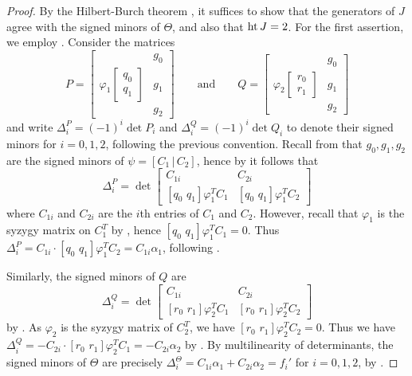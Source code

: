 \documentclass[reqno]{amsart}
\numberwithin{equation}{section}
\theoremstyle{definition}
\def\hgt{\mathop{\rm ht}}
\begin{document}
\begin{proof}
By the Hilbert-Burch theorem \cite[20.15]{Eisenbud}, it suffices to show that the generators of $J$ agree with the signed minors of $\Theta$, and also that $\hgt J = 2$. For the first assertion, we employ . Consider the matrices
\[
P=\left[
\begin{array}{c|c}
     & g_0  \\
 \varphi_1\begin{bmatrix}
     q_0\\
     q_1
 \end{bmatrix}     & g_1\\
     &g_2
\end{array}
\right]
\quad\quad\text{and}\quad\quad
Q=\left[
\begin{array}{c|c}
     & g_0  \\
 \varphi_2\begin{bmatrix}
     r_0\\
     r_1
 \end{bmatrix}    & g_1\\
     &g_2
\end{array}
\right]
\]
and write $\Delta^P_i= (-1)^i\det P_i$ and $\Delta^Q_i = (-1)^i\det Q_i$ to denote their signed minors for $i=0,1,2$, following the previous convention. Recall from  that $g_0,g_1,g_2$ are the signed minors of $\psi = [C_1\,|\,C_2]$, hence by  it follows that
\[
\Delta^P_i = \det \left[
\begin{array}{cc}
    C_{1i}& C_{2i} \\[1ex]
[q_0 \,\, q_1]\varphi_1^T C_1 & [q_0\,\,q_1]\varphi_1^T C_2
\end{array}
\right]
\]
where $C_{1i}$ and $C_{2i}$ are the $i$th entries of $C_1$ and $C_2$. However, recall that $\varphi_1$ is the syzygy matrix on $C_1^T$ by , hence $[q_0 \,\, q_1]\varphi_1^T C_1 =0$. Thus $\Delta^P_i = C_{1i} \cdot [q_0\,\,q_1]\varphi_1^T C_2 = C_{1i} \alpha_1$, following . 

Similarly, the signed minors of $Q$ are 
\[
\Delta^Q_i = \det \left[
\begin{array}{cc}
    C_{1i}& C_{2i} \\[1ex]
[r_0 \,\, r_1]\varphi_2^T C_1 & [r_0\,\,r_1]\varphi_2^T C_2
\end{array}
\right]
\]
by . As $\varphi_2$ is the syzygy matrix of $C_2^T$, we have $[r_0\,\,r_1]\varphi_2^T C_2=0$. Thus we have $\Delta^Q_i = -C_{2i} \cdot [r_0 \,\, r_1]\varphi_2^T C_1 = - C_{2i} \alpha_2$ by . By multilinearity of determinants, the signed minors of $\Theta$ are precisely $\Delta^\Theta_i = C_{1i} \alpha_1 +C_{2i} \alpha_2 = f_i'$ for $i=0,1,2$, by .






\end{proof}
\end{document}
